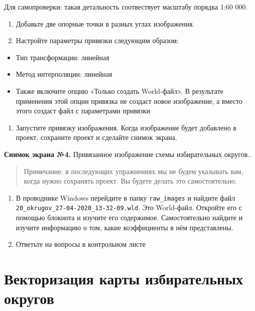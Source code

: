 \documentclass[
  12pt,
]{book}
\providecommand{\tightlist}{%
  \setlength{\itemsep}{0pt}\setlength{\parskip}{0pt}}
\begin{document}
Для самопроверки: такая детальность соотвествует масштабу порядка 1:60 000.

\begin{enumerate}
\def\labelenumi{\arabic{enumi}.}
\setcounter{enumi}{8}
\item
  Добавьте две опорные точки в разных углах изображения.
\item
  Настройте параметры привязки следующим образом:
\end{enumerate}

\begin{itemize}
\tightlist
\item
  Тип трансформации: линейная
\item
  Метод интерполяции: линейная
\item
  Также включите опцию «Только создать World-файл». В результате применения этой опции привязка не создаст новое изображение, а вместо этого создаст файл с параметрами привязки
\end{itemize}

\begin{enumerate}
\def\labelenumi{\arabic{enumi}.}
\setcounter{enumi}{10}
\tightlist
\item
  Запустите привязку изображения. Когда изображение будет добавлено в проект, сохраните проект и сделайте снимок экрана.
\end{enumerate}

\textbf{Снимок экрана №4.} Привязанное изображение схемы избирательных округов..

\begin{quote}
Примечание: в последующих упражнениях мы не будем указывать вам, когда нужно сохранять проект. Вы будете делать это самостоятельно.
\end{quote}

\begin{enumerate}
\def\labelenumi{\arabic{enumi}.}
\setcounter{enumi}{11}
\item
  В проводнике Windows перейдите в папку \texttt{raw\_images} и найдите файл \texttt{20\_okrugov\_27-04-2020\_13-32-09.wld}. Это World-файл. Откройте его с помощью блокнота и изучите его содержимое. Самостоятельно найдите и изучите информацию о том, какие коэффициенты в нём представлены.
\item
  Ответьте на вопросы в контрольном листе
\end{enumerate}

\hypertarget{digitizing-districts}{%
\chapter{Векторизация карты избирательных округов}\label{digitizing-districts}}
\end{document}
